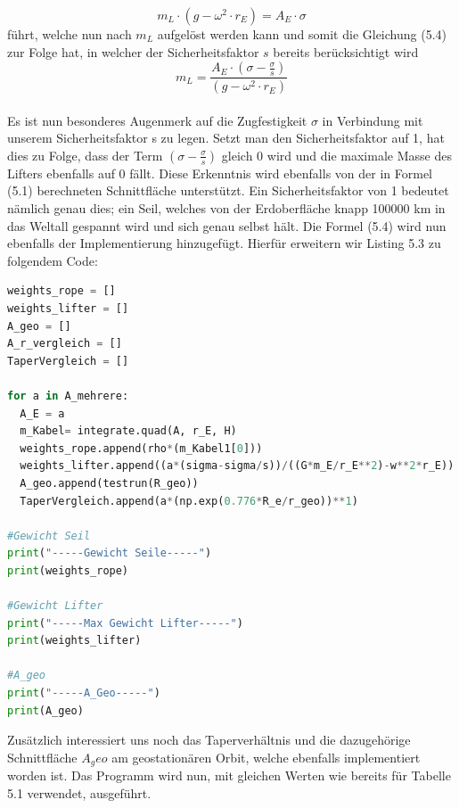 \documentclass[a4paper, 10pt]{report}
\begin{document}
\begin{equation}
m_L \cdot (g - \omega^2 \cdot r_E) =  A_E \cdot \sigma
\end{equation}
führt, welche nun nach \( m_L \) aufgelöst werden kann und somit die Gleichung (5.4) zur Folge hat, in welcher der Sicherheitsfaktor \( s \) bereits berücksichtigt wird \\
\begin{equation}
m_L =   \frac{A_E \cdot (\sigma - \frac{\sigma}{s})} {(g - \omega^2 \cdot r_E)}
\end{equation}
\\
Es ist nun besonderes Augenmerk auf die Zugfestigkeit \( \sigma \) in Verbindung mit unserem Sicherheitsfaktor s zu legen. Setzt man den Sicherheitsfaktor auf 1, hat dies zu Folge, dass der Term   \((\sigma - \frac{\sigma}{s})\) gleich 0 wird und die maximale Masse des Lifters ebenfalls auf 0 fällt. Diese Erkenntnis wird ebenfalls von der in Formel (5.1) berechneten Schnittfläche unterstützt. Ein Sicherheitsfaktor von 1 bedeutet nämlich genau dies; ein Seil, welches von der Erdoberfläche knapp 100000 km in das Weltall gespannt wird und sich genau selbst hält.
Die Formel (5.4) wird nun ebenfalls der Implementierung hinzugefügt. Hierfür erweitern wir Listing 5.3 zu folgendem Code:\\
\begin{lstlisting}[language=Python, caption=Hinzufügen der Berechnungen zur Ermittlung des max. Gewichts des Lifters]
weights_rope = []
weights_lifter = []
A_geo = []
A_r_vergleich = []
TaperVergleich = []

for a in A_mehrere:
  A_E = a
  m_Kabel= integrate.quad(A, r_E, H)
  weights_rope.append(rho*(m_Kabel1[0]))
  weights_lifter.append((a*(sigma-sigma/s))/((G*m_E/r_E**2)-w**2*r_E))
  A_geo.append(testrun(R_geo))
  TaperVergleich.append(a*(np.exp(0.776*R_e/r_geo))**1)
  
#Gewicht Seil
print("-----Gewicht Seile-----")
print(weights_rope)

#Gewicht Lifter
print("-----Max Gewicht Lifter-----")
print(weights_lifter)

#A_geo
print("-----A_Geo-----")
print(A_geo)
\end{lstlisting}
Zusätzlich interessiert uns noch das Taperverhältnis und die dazugehörige Schnittfläche \( A_geo \) am geostationären Orbit, welche ebenfalls implementiert worden ist. Das Programm wird nun, mit gleichen Werten wie bereits für Tabelle 5.1 verwendet, ausgeführt. \\
\end{document}
